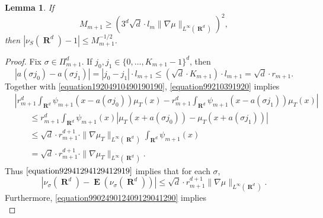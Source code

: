 \documentclass[12pt,reqno]{article}
\numberwithin{equation}{section}
\DeclareMathOperator{\RR}{\mathbf{R}}
\newtheorem{lemma}[theorem]{Lemma}
\DeclareMathOperator{\EE}{\mathbf{E}}
\begin{document}
\begin{lemma} \label{nuNormalizationLemma}
    If
    \begin{equation} \label{equation10491249012}
        M_{m+1} \geq \left( 3^d \sqrt{d} \cdot l_m \| \nabla \mu \|_{L^\infty(\RR^d)} \right)^2,
    \end{equation}
    then $|\nu_S(\RR^d) - 1| \leq M_{m+1}^{-1/2}$.
\end{lemma}
\begin{proof}
    Fix $\sigma \in \Pi_{m+1}^d$. If $j_0, j_1 \in \{ 0, \dots, K_{m+1} - 1 \}^d$, then
    \begin{equation} \label{equation99210391920}
        |a(\sigma j_0) - a(\sigma j_1)| = |j_0 - j_1| \cdot l_{m+1} \leq (\sqrt{d} \cdot K_{m+1}) \cdot l_{m+1} = \sqrt{d} \cdot r_{m+1}.
    \end{equation}
    Together with \eqref{equation19204910490190190}, \eqref{equation99210391920} implies
    \begin{equation} \label{equation92941294129412919}
    \begin{split}
        &\left| r_{m+1}^d \int_{\RR^d} \psi_{m+1}(x - a(\sigma j_0)) \mu_T(x) - r_{m+1}^d \int_{\RR^d} \psi_{m+1}(x - a(\sigma j_1)) \mu_T(x) \right|\\
        &\ \ \ \ \ \ \ \ \leq r_{m+1}^d \int_{\RR^d} \psi_{m+1}(x) \left| \mu_T(x + a(\sigma j_0)) - \mu_T(x + a(\sigma j_1)) \right|\\
        &\ \ \ \ \ \ \ \ \leq \sqrt{d} \cdot r_{m+1}^{d+1} \cdot \| \nabla \mu_T \|_{L^\infty(\RR^d)} \int_{\RR^d} \psi_{m+1}(x)\\
        &\ \ \ \ \ \ \ \ = \sqrt{d} \cdot r_{m+1}^{d+1} \cdot \| \nabla \mu_T \|_{L^\infty(\RR^d)}.
    \end{split}
    \end{equation}
    Thus $\eqref{equation92941294129412919}$ implies that for each $\sigma$,
    \begin{equation} \label{equation491040912491}
        |\nu_\sigma(\RR^d) - \EE(\nu_\sigma(\RR^d))| \leq \sqrt{d} \cdot r_{m+1}^{d+1} \| \nabla \mu \|_{L^\infty(\RR^d)}.
    \end{equation}
    Furthermore, \eqref{equation990249012409129041290} implies
    \begin{equation} \label{9921490124912}

\end{equation}
\end{proof}
\end{document}

